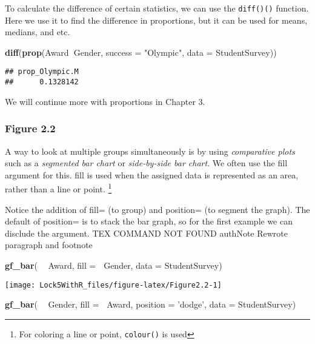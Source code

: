 \documentclass[]{book}
\newenvironment{Shaded}{\begin{snugshade}}{\end{snugshade}}
\newcommand{\DataTypeTok}[1]{\textcolor[rgb]{0.13,0.29,0.53}{#1}}
\newcommand{\KeywordTok}[1]{\textcolor[rgb]{0.13,0.29,0.53}{\textbf{#1}}}
\newcommand{\NormalTok}[1]{#1}
\newcommand{\OperatorTok}[1]{\textcolor[rgb]{0.81,0.36,0.00}{\textbf{#1}}}
\newcommand{\StringTok}[1]{\textcolor[rgb]{0.31,0.60,0.02}{#1}}
\let\rmarkdownfootnote\footnote%
\def\footnote{\protect\rmarkdownfootnote}
\begin{document}
To calculate the difference of certain statistics, we can use the \texttt{diff()()} function. Here we use it to find the difference in proportions, but it can be used for means, medians, and etc.

\begin{Shaded}
\begin{Highlighting}[]
\KeywordTok{diff}\NormalTok{(}\KeywordTok{prop}\NormalTok{(Award}\OperatorTok{~}\NormalTok{Gender, }\DataTypeTok{success =} \StringTok{"Olympic"}\NormalTok{, }\DataTypeTok{data =}\NormalTok{ StudentSurvey))}
\end{Highlighting}
\end{Shaded}

\begin{verbatim}
## prop_Olympic.M 
##      0.1328142
\end{verbatim}

We will continue more with proportions in Chapter 3.

\hypertarget{figure-2.2}{%
\subsubsection{Figure 2.2}\label{figure-2.2}}

A way to look at multiple groups simultaneously is by using \emph{comparative plots} such as a \emph{segmented bar chart} or \emph{side-by-side bar chart}. We often use the {fill} argument for this. {fill} is used when the assigned data is represented as an area, rather than a line or point.
\footnote{For coloring a line or point, \texttt{colour()} is used}

Notice the addition of {fill=} (to group) and {position=} (to segment the graph). The default of {position=} is to stack the bar graph, so for the first example we can disclude the argument.
TEX COMMAND NOT FOUND authNote Rewrote paragraph and footnote

\begin{Shaded}
\begin{Highlighting}[]
\KeywordTok{gf_bar}\NormalTok{( }\OperatorTok{~}\StringTok{ }\NormalTok{Award, }\DataTypeTok{fill =} \OperatorTok{~}\NormalTok{Gender, }\DataTypeTok{data =}\NormalTok{ StudentSurvey)}
\end{Highlighting}
\end{Shaded}

\texttt{[image: Lock5WithR\_files/figure-latex/Figure2.2-1]}

\begin{Shaded}
\begin{Highlighting}[]
\KeywordTok{gf_bar}\NormalTok{( }\OperatorTok{~}\StringTok{ }\NormalTok{Gender, }\DataTypeTok{fill =} \OperatorTok{~}\NormalTok{Award, }\DataTypeTok{position =} \StringTok{'dodge'}\NormalTok{, }\DataTypeTok{data =}\NormalTok{ StudentSurvey)}
\end{Highlighting}
\end{Shaded}
\end{document}
